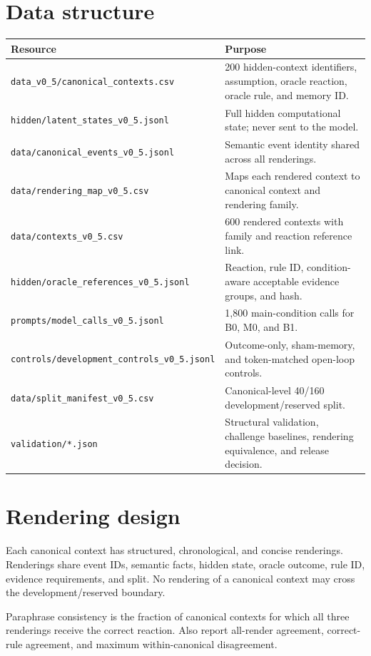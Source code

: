 \documentclass[10.5pt]{article}
\begin{document}
\section{Data structure}
\begin{longtable}{p{}p{}}
\toprule\textbf{Resource}&\textbf{Purpose}\\\midrule
\texttt{data\_v0\_5/canonical\_contexts.csv} & 200 hidden-context identifiers, assumption, oracle reaction, oracle rule, and memory ID.\\
\texttt{hidden/latent\_states\_v0\_5.jsonl} & Full hidden computational state; never sent to the model.\\
\texttt{data/canonical\_events\_v0\_5.jsonl} & Semantic event identity shared across all renderings.\\
\texttt{data/rendering\_map\_v0\_5.csv} & Maps each rendered context to canonical context and rendering family.\\
\texttt{data/contexts\_v0\_5.csv} & 600 rendered contexts with family and reaction reference link.\\
\texttt{hidden/oracle\_references\_v0\_5.jsonl} & Reaction, rule ID, condition-aware acceptable evidence groups, and hash.\\
\texttt{prompts/model\_calls\_v0\_5.jsonl} & 1,800 main-condition calls for B0, M0, and B1.\\
\texttt{controls/development\_controls\_v0\_5.jsonl} & Outcome-only, sham-memory, and token-matched open-loop controls.\\
\texttt{data/split\_manifest\_v0\_5.csv} & Canonical-level 40/160 development/reserved split.\\
\texttt{validation/*.json} & Structural validation, challenge baselines, rendering equivalence, and release decision.\\
\bottomrule
\end{longtable}

\section{Rendering design}
Each canonical context has structured, chronological, and concise renderings. Renderings share event IDs, semantic facts, hidden state, oracle outcome, rule ID, evidence requirements, and split. No rendering of a canonical context may cross the development/reserved boundary.

Paraphrase consistency is the fraction of canonical contexts for which all three renderings receive the correct reaction. Also report all-render agreement, correct-rule agreement, and maximum within-canonical disagreement.
\end{document}
